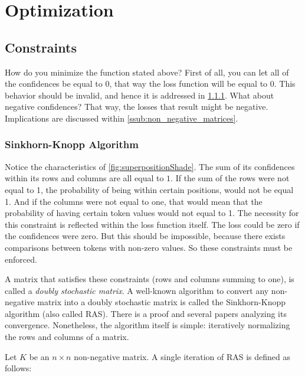 \section{Optimization}%
\label{sec:optimization}
\subsection{Constraints}%
\label{sub:constraints}
How do you minimize the function stated above? First of all, you can let all of the confidences be equal to $0$, that way the loss function will be equal to $0$. This behavior should be invalid, and hence it is addressed in \ref{ssub:sinkhorn_knopp_algorithm}. What about negative confidences? That way, the losses that result might be negative. Implications are discussed within \ref{ssub:non_negative_matrices}.

\subsubsection{Sinkhorn-Knopp Algorithm}%
\label{ssub:sinkhorn_knopp_algorithm}
Notice the characteristics of \autoref{fig:superpositionShade}. The sum of its confidences within its rows and columns are all equal to $1$. If the sum of the rows were not equal to 1, the probability of being within certain positions, would not be equal 1. And if the columns were not equal to one, that would mean that the probability of having certain token values would not equal to 1. The necessity for this constraint is reflected within the loss function itself. The loss could be zero if the confidences were zero. But this should be impossible, because there exists comparisons between tokens with non-zero values. So these constraints must be enforced.

A matrix that satisfies these constraints (rows and columns summing to one), is called a \emph{doubly stochastic matrix}. A well-known algorithm to convert any non-negative matrix into a doubly stochastic matrix is called the Sinkhorn-Knopp algorithm (also called RAS).\cite{sinkhorn1967concerning} There is a proof\cite{borobia1998matrix} and several papers\cite{chakrabarty2018better,knight2008sinkhorn} analyzing its convergence. Nonetheless, the algorithm itself is simple: iteratively normalizing the rows and columns of a matrix.

 Let $K$ be an $n\times n$ non-negative matrix. A single iteration of RAS is defined as follows:

